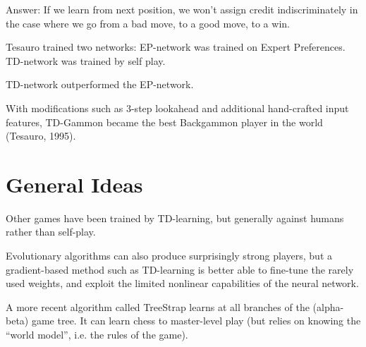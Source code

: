 Answer: If we learn from next position, we won't assign credit indiscriminately
in the case where we go from a bad move, to a good move, to a win.

Tesauro trained two networks: EP-network was trained on Expert Preferences.
TD-network was trained by self play.

TD-network outperformed the EP-network.

With modifications such as 3-step lookahead and additional hand-crafted input
features, TD-Gammon became the best Backgammon player in the world (Tesauro,
1995).

\section{General Ideas}
Other games have been trained by TD-learning, but generally against humans
rather than self-play.

Evolutionary algorithms can also produce surprisingly strong players, but a
gradient-based method such as TD-learning is better able to fine-tune the
rarely used weights, and exploit the limited nonlinear capabilities of the
neural network.

A more recent algorithm called TreeStrap learns at all branches of the
(alpha-beta) game tree. It can learn chess to master-level play (but relies on
knowing the ``world model'', i.e. the rules of the game).
